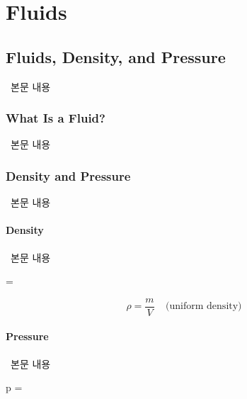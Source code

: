 
\chapter{Fluids}%

\section{Fluids, Density, and Pressure}
%
\ 본문 내용

\subsection{What Is a Fluid?}
%
\ 본문 내용

\subsection{Density and Pressure}
%
\ 본문 내용

\subsubsection{Density}
%
\ 본문 내용

\begin{eqbox} \rho = 
\label{eq:density}\end{eqbox}

\begin{equation} \rho = \frac{m}{V} ~~~~~ \text{(uniform density)} \end{equation}

\subsubsection{Pressure}
%
\ 본문 내용

\begin{eqbox} p = 
\label{eq:pressure_on_the_piston}\end{eqbox}


